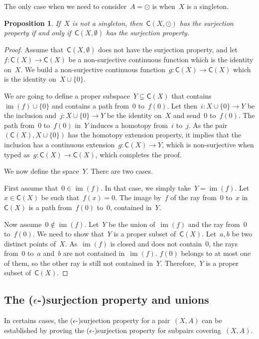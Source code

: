 \documentclass[english,11pt]{article}
\theoremstyle{plain}
\newtheorem{proposition}{Proposition}[section]
\theoremstyle{remark}
\theoremstyle{definition}
\newcommand{\unit}{\odot}%
\newcommand{\im}{\mathop{\mathrm{im}}}
\newcommand{\C}[1]{\mathsf{C}(#1)}%
\begin{document}
The only case when we need to consider~$A=\unit$ is when~$X$ is a singleton.
\begin{proposition}
If~$X$ is not a singleton, then~$\C{X,\unit}$ has the surjection property if and only if~$\C{X,\emptyset}$ has the surjection property.
\end{proposition}
\begin{proof}
Assume that~$\C{X,\emptyset}$ does not have the surjection property, and let~$f:\C{X}\to\C{X}$ be a non-surjective continuous function which is the identity on~$X$. We build a non-surjective continuous function~$g:\C{X}\to\C{X}$ which is the identity on~$X\cup\{0\}$.

We are going to define a proper subspace~$Y\subsetneq \C{X}$ that contains~$\im(f)\cup \{0\}$ and contains a path from~$0$ to~$f(0)$. Let then~$i:X\cup\{0\}\to Y$ be the inclusion and~$j:X\cup \{0\}\to Y$ be the identity on~$X$ and send~$0$ to~$f(0)$. The path from~$0$ to~$f(0)$ in~$Y$ induces a homotopy from~$i$ to~$j$. As the pair~$(\C{X},X\cup\{0\})$ has the homotopy extension property, it implies that the inclusion has a continuous extension~$g:\C{X}\to Y$, which is non-surjective when typed as~$g:\C{X}\to\C{X}$, which completes the proof.

We now define the space~$Y$. There are two cases.

First assume that~$0\in \im (f)$. In that case, we simply take~$Y=\im(f)$. Let~$x\in\C{X}$ be such that~$f(x)=0$. The image by~$f$ of the ray from~$0$ to~$x$ in~$\C{X}$ is a path from~$f(0)$ to~$0$, contained in~$Y$.

Now assume~$0\notin\im(f)$. Let~$Y$ be the union of~$\im(f)$ and the ray from~$0$ to~$f(0)$. We need to show that~$Y$ is a proper subset of~$\C{X}$. Let~$a,b$ be two distinct points of~$X$. As~$\im(f)$ is closed and does not contain~$0$, the rays from~$0$ to~$a$ and~$b$ are not contained in~$\im(f)$. $f(0)$ belongs to at most one of them, so the other ray is still not contained in~$Y$. Therefore,~$Y$ is a proper subset of~$\C{X}$.
\end{proof}

\subsection{The (\texorpdfstring{$\epsilon$}{epsilon}-)surjection property and unions}

In certains cases, the ($\epsilon$-)surjection property for a pair~$(X,A)$ can be established by proving the ($\epsilon$-)surjection property  for subpairs covering~$(X,A)$.
\end{document}

